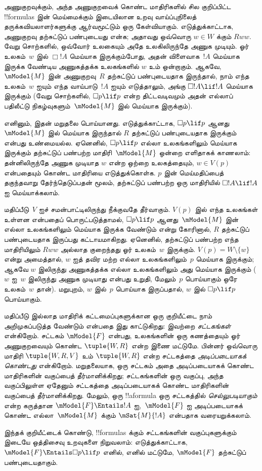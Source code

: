 \documentclass[../../../include/open-logic-section]{subfiles}
\begin{document}


அணுகுறவுக்கும், அந்த அணுகுறவைக் கொண்ட மாதிரிகளில் சில குறிப்பிட்ட
!!{formula}s இன் மெய்மைக்கும் இடையிலான உறவு வாய்ப்புநிலைத்
தருக்கவியலாளர்களுக்கு ஆர்வமூட்டும் ஒரு கேள்வியாகும். எடுத்துக்காட்டாக,
அணுகுறவு தற்சுட்டுப் பண்புடையது என்க; அதாவது ஒவ்வொரு $w \in W$ க்கும்
$Rww$. வேறு சொற்களில், ஒவ்வோர் உலகையும் அதே உலகிலிருந்தே அணுக முடியும்.
ஓர் உலகம்~$w$ இல் $\Box !A$ மெய்யாக இருக்கும்போது, அதன் விளைவாக~$!A$
மெய்யாக இருக்க வேண்டிய அணுகத்தக்க உலகங்களில் $w$ உம் ஒன்றாகும். ஆகவே,
$\mModel{M}$ இன் அணுகுறவு~$R$ தற்சுட்டுப் பண்புடையதாக இருந்தால், நாம் எந்த
உலகம்~$w$ ஐயும் எந்த வாய்பாடு~$!A$ ஐயும் எடுத்தாலும், அங்கு $\Box !A
\lif !A$ மெய்யாக இருக்கும் (வேறு சொற்களில், $\Box p \lif p$ என்ற
திட்டவடிவமும் அதன் எல்லாப் பதிலீட்டு நிகழ்வுகளும்~$\mModel{M}$ இல்
மெய்யாக இருக்கும்).

எனினும், இதன் மறுதலை பொய்யானது. எடுத்துக்காட்டாக, $\Box p \lif p$
ஆனது~$\mModel{M}$ இல் மெய்யாக இருந்தால் $R$ தற்சுட்டுப் பண்புடையதாக
இருக்கும் என்பது உண்மையல்ல. ஏனெனில், $\Box p \lif p$ எல்லா உலகங்களிலும்
மெய்யாக இருக்கும் தற்சுட்டுப் பண்பற்ற மாதிரி~$\mModel{M}$ ஒன்றை எளிதாகக்
காணலாம்: தன்னிலிருந்தே அணுக முடியாத $w$ என்ற ஒற்றை உலகத்தையும், $w \in
V(p)$ என்பதையும் கொண்ட மாதிரியை எடுத்துக்கொள்க. $p$ இன் மெய்மதிப்பைத்
தகுந்தவாறு தேர்ந்தெடுப்பதன் மூலம், தற்சுட்டுப் பண்பற்ற ஒரு மாதிரியில்
$\Box !A \lif !A$ ஐ மெய்யாக்கலாம்.

மதிப்பீடு~$V$ ஐச் சமன்பாட்டிலிருந்து நீக்குவதே தீர்வாகும்.
$V(p)$ இல் எந்த உலகங்கள் உள்ளன என்பதைப் பொருட்படுத்தாமல், $\Box p \lif
p$ ஆனது~$\mModel{M}$ இன் எல்லா உலகங்களிலும் மெய்யாக இருக்க வேண்டும் என்று
கோரினால், $R$ தற்சுட்டுப் பண்புடையதாக இருப்பது கட்டாயமாகிறது. ஏனெனில்,
தற்சுட்டுப் பண்பற்ற எந்த மாதிரியிலும் $Rww$ அல்லாத குறைந்தது ஓர் உலகம்~$w$
இருக்கும். $V(p) = W \setminus \{w\}$ என்று அமைத்தால், $w$ ஐத் தவிர மற்ற
எல்லா உலகங்களிலும்~$p$ மெய்யாக இருக்கும்; ஆகவே $w$ இலிருந்து அணுகத்தக்க
எல்லா உலகங்களிலும் அது மெய்யாக இருக்கும் ($w$ ஐ~$w$ இலிருந்து அணுக
முடியாது என்பது உறுதி, மேலும்~$p$ பொய்யாகும் ஒரே உலகம்~$w$ தான்).
மறுபுறம், $w$ இல்~$p$ பொய்யாக இருப்பதால், $w$ இல் $\Box p \lif p$
பொய்யாகும்.

மதிப்பீடு இல்லாத மாதிரிக் கட்டமைப்புகளுக்கான ஒரு குறியீட்டை நாம்
அறிமுகப்படுத்த வேண்டும் என்பதை இது காட்டுகிறது: இவற்றை \emph{சட்டகங்கள்}
என்கிறோம். சட்டகம் $\mModel{F}$ என்பது, உலகங்களின் ஒரு கணத்தையும் ஓர்
அணுகுறவையும் கொண்ட $\tuple{W, R}$ என்ற இணை மட்டுமே. பின்னர் ஒவ்வொரு மாதிரி
$\tuple{W, R, V}$ உம் $\tuple{W, R}$ என்ற சட்டகத்தை \emph{அடிப்படையாகக்
கொண்டது} என்கிறோம். மறுதலையாக, ஒரு சட்டகம் அதை அடிப்படையாகக் கொண்ட
மாதிரிகளின் வகுப்பைத் தீர்மானிக்கிறது; சட்டகங்களின் ஒரு வகுப்பு, அந்த
வகுப்பிலுள்ள ஏதேனும் சட்டகத்தை அடிப்படையாகக் கொண்ட மாதிரிகளின் வகுப்பைத்
தீர்மானிக்கிறது. மேலும், ஒரு !!a{formula} ஒரு சட்டகத்தில் \emph{செல்லுபடியாகும்}
என்ற கருத்தான $\mModel{F} \Entails !A$ ஐ,~$\mModel{F}$ ஐ அடிப்படையாகக் கொண்ட
எல்லா~$\mModel{M}$ க்கும் $\mSat{M}{!A}$ என்பதாக வரையறுக்கலாம்.

இந்தக் குறியீட்டைக் கொண்டு, !!{formula}s க்கும் சட்டகங்களின் வகுப்புகளுக்கும்
இடையே ஒத்திசைவு உறவுகளை நிறுவலாம்: எடுத்துக்காட்டாக, $\mModel{F} \Entails
\Box p \lif p$ எனில், எனில் மட்டுமே, $\mModel{F}$ தற்சுட்டுப்
பண்புடையதாகும்.
\end{document}
